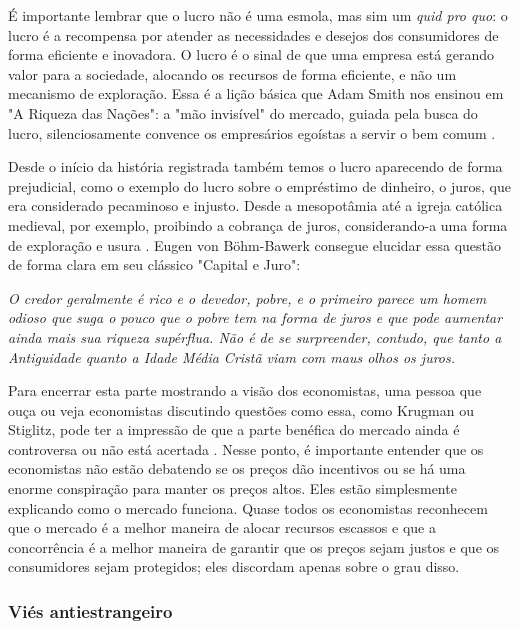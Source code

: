 É importante lembrar que o lucro não é uma esmola, mas sim um \textit{quid pro quo}: o lucro é a recompensa por atender as necessidades e desejos dos consumidores de forma eficiente e inovadora. O lucro é o sinal de que uma empresa está gerando valor para a sociedade, alocando os recursos de forma eficiente, e não um mecanismo de exploração. Essa é a lição básica que Adam Smith nos ensinou em "A Riqueza das Nações": a "mão invisível" do mercado, guiada pela busca do lucro, silenciosamente convence os empresários egoístas a servir o bem comum \cite{smith1776inquiry}.

Desde o início da história registrada também temos o lucro aparecendo de forma prejudicial, como o exemplo do lucro sobre o empréstimo de dinheiro, o juros, que era considerado pecaminoso e injusto. Desde a mesopotâmia até a igreja católica medieval, por exemplo, proibindo a cobrança de juros, considerando-a uma forma de exploração e usura \cite{tomasdeaquino_summa_78}. Eugen von Böhm-Bawerk consegue elucidar essa questão de forma clara em seu clássico "Capital e Juro":

\begin{citacao}
    \textit{O credor geralmente é rico e o devedor, pobre, e o primeiro parece um homem odioso que suga o pouco que o pobre tem na forma de juros e que pode aumentar ainda mais sua riqueza supérflua. Não é de se surpreender, contudo, que tanto a Antiguidade quanto a Idade Média Cristã viam com maus olhos os juros. 
    } \newline \cite{von2022capital}
\end{citacao}

Para encerrar esta parte mostrando a visão dos economistas, uma pessoa que ouça ou veja economistas discutindo questões como essa, como Krugman ou Stiglitz, pode ter a impressão de que a parte benéfica do mercado ainda é controversa ou não está acertada \cite{krugman2003great,stiglitz2003roaring,The_Myth_of_the_Rational_Voter}. Nesse ponto, é importante entender que os economistas não estão debatendo se os preços dão incentivos ou se há uma enorme conspiração para manter os preços altos. Eles estão simplesmente explicando como o mercado funciona. Quase todos os economistas reconhecem que o mercado é a melhor maneira de alocar recursos escassos e que a concorrência é a melhor maneira de garantir que os preços sejam justos e que os consumidores sejam protegidos; eles discordam apenas sobre o grau disso.

\subsubsection{Viés antiestrangeiro}

